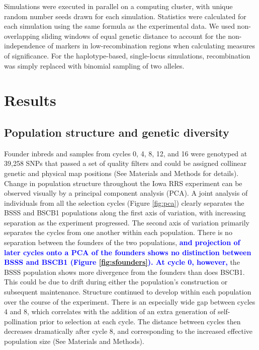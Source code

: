 \documentclass[twocolumn,twoside,letterpaper]{article}
\newcommand{\rev}[1]{\textcolor{blue}{\bf #1}}
\begin{document}
Simulations were executed in parallel on a computing cluster, with unique random number seeds drawn for each simulation. 
Statistics were calculated for each simulation using the same formula as the experimental data. 
We used non-overlapping sliding windows of equal genetic distance to account for the non-independence of markers in low-recombination regions when calculating measures of significance. 
For the haplotype-based, single-locus simulations, recombination was simply replaced with binomial sampling of two alleles.

\section*{Results}

\subsection*{Population structure and genetic diversity}
Founder inbreds and samples from cycles 0, 4, 8, 12, and 16 were genotyped at 39,258 SNPs that passed a set of quality filters and could be assigned collinear genetic and physical map positions (See Materials and Methods for details). 
Change in population structure throughout the Iowa RRS experiment can be observed visually by a principal component analysis (PCA). 
A joint analysis of individuals from all the selection cycles (Figure \ref{fig:pca}) clearly separates the BSSS and BSCB1 populations along the first axis of variation, with increasing separation as the experiment progressed. 
The second axis of variation primarily separates the cycles from one another within each population. 
There is no separation between the founders of the two populations, \rev{and projection of later cycles onto a PCA of the founders shows no distinction between BSSS and BSCB1 (Figure \ref{fig:sfounders}).
At cycle 0, however,} the BSSS population shows more divergence from the founders than does BSCB1. 
This could be due to drift during either the population’s construction or subsequent maintenance. 
Structure continued to develop within each population over the course of the experiment. 
There is an especially wide gap between cycles 4 and 8, which correlates with the addition of an extra generation of self-pollination prior to selection at each cycle. 
The distance between cycles then decreases dramatically after cycle 8, and corresponding to the increased effective population size (See Materials and Methods).
\end{document}
